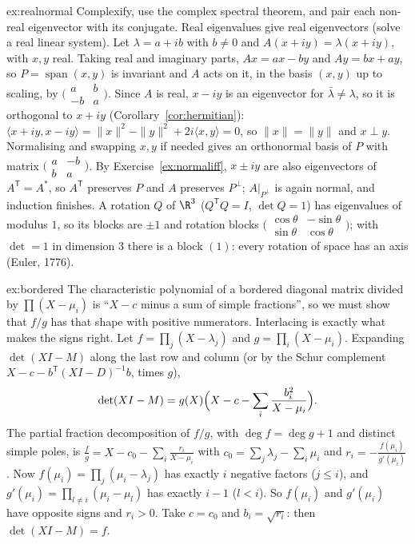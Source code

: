 \begin{solution}{ex:realnormal}
\idea Complexify, use the complex spectral theorem, and pair each non-real eigenvector with its conjugate.
\writeup Real eigenvalues give real eigenvectors (solve a real linear system). Let $\lambda=a+ib$ with $b\ne0$ and
$A(x+iy)=\lambda(x+iy)$, with $x,y$ real. Taking real and imaginary parts, $Ax=ax-by$ and $Ay=bx+ay$, so $P=\operatorname{span}
(x,y)$ is invariant and $A$ acts on it, in the basis $(x,y)$ up to scaling, by $\bigl(\begin{smallmatrix}a&b\\-b&a
\end{smallmatrix}\bigr)$. Since $A$ is real, $x-iy$ is an eigenvector for $\bar\lambda\ne\lambda$, so it is orthogonal to
$x+iy$ (Corollary~\ref{cor:hermitian}): $\langle x+iy,x-iy\rangle=\|x\|^2-\|y\|^2+2i\langle x,y\rangle=0$, so $\|x\|=\|y\|$
and $x\perp y$. Normalising and swapping $x,y$ if needed gives an orthonormal basis of $P$ with matrix $\bigl(\begin{smallmatrix}
a&-b\\b&a\end{smallmatrix}\bigr)$. By Exercise~\ref{ex:normaliff}, $x\pm iy$ are also eigenvectors of $A^{\mathsf T}=A^*$, so
$A^{\mathsf T}$ preserves $P$ and $A$ preserves $P^\perp$; $A|_{P^\perp}$ is again normal, and induction finishes. A rotation
$Q$ of $\R^3$ ($Q^{\mathsf T}Q=I$, $\det Q=1$) has eigenvalues of modulus $1$, so its blocks are $\pm1$ and rotation blocks
$\bigl(\begin{smallmatrix}\cos\theta&-\sin\theta\\\sin\theta&\cos\theta\end{smallmatrix}\bigr)$; with $\det=1$ in dimension $3$
there is a block $(1)$: every rotation of space has an axis (Euler, 1776).
\end{solution}

\begin{solution}{ex:bordered}
\idea The characteristic polynomial of a bordered diagonal matrix divided by $\prod(X-\mu_i)$ is ``$X-c$ minus a sum of
simple fractions'', so we must show that $f/g$ has that shape with positive numerators. Interlacing is exactly what makes the
signs right.
\writeup Let $f=\prod_j(X-\lambda_j)$ and $g=\prod_i(X-\mu_i)$. Expanding $\det(XI-M)$ along the last row and column (or by
the Schur complement $X-c-b^{\mathsf T}(XI-D)^{-1}b$, times $g$),
\[
\det(XI-M)=g(X)\Bigl(X-c-\sum_i\frac{b_i^2}{X-\mu_i}\Bigr).
\]
The partial fraction decomposition of $f/g$, with $\deg f=\deg g+1$ and distinct simple poles, is
$\frac fg=X-c_0-\sum_i\frac{r_i}{X-\mu_i}$ with $c_0=\sum_j\lambda_j-\sum_i\mu_i$ and $r_i=-\frac{f(\mu_i)}{g'(\mu_i)}$.
Now $f(\mu_i)=\prod_j(\mu_i-\lambda_j)$ has exactly $i$ negative factors ($j\le i$), and $g'(\mu_i)=\prod_{l\ne i}(\mu_i-\mu_l)$
has exactly $i-1$ ($l<i$). So $f(\mu_i)$ and $g'(\mu_i)$ have opposite signs and $r_i>0$. Take $c=c_0$ and $b_i=\sqrt{r_i}$:
then $\det(XI-M)=f$.
\end{solution}

